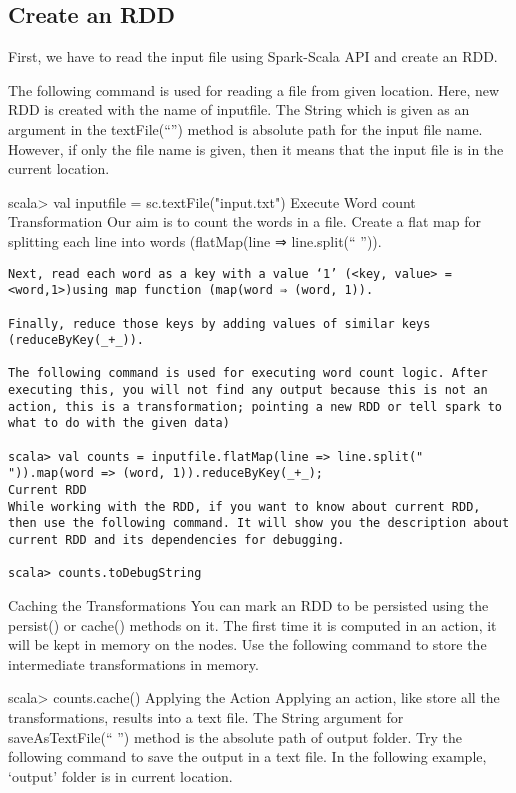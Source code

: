 \documentclass[a4paper,12pt]{article}
\begin{document}
\subsection*{Create an RDD}
First, we have to read the input file using Spark-Scala API and create an RDD.

The following command is used for reading a file from given location. Here, new RDD is created with the name of inputfile. The String which is given as an argument in the textFile(“”) method is absolute path for the input file name. However, if only the file name is given, then it means that the input file is in the current location.

scala> val inputfile = sc.textFile("input.txt")
Execute Word count Transformation
Our aim is to count the words in a file. Create a flat map for splitting each line into words (flatMap(line ⇒ line.split(“ ”)).

\begin{verbatim}
Next, read each word as a key with a value ‘1’ (<key, value> = <word,1>)using map function (map(word ⇒ (word, 1)).

Finally, reduce those keys by adding values of similar keys (reduceByKey(_+_)).

The following command is used for executing word count logic. After executing this, you will not find any output because this is not an action, this is a transformation; pointing a new RDD or tell spark to what to do with the given data)

scala> val counts = inputfile.flatMap(line => line.split(" ")).map(word => (word, 1)).reduceByKey(_+_);
Current RDD
While working with the RDD, if you want to know about current RDD, then use the following command. It will show you the description about current RDD and its dependencies for debugging.

scala> counts.toDebugString    
\end{verbatim}

Caching the Transformations
You can mark an RDD to be persisted using the persist() or cache() methods on it. The first time it is computed in an action, it will be kept in memory on the nodes. Use the following command to store the intermediate transformations in memory.

scala> counts.cache()
Applying the Action
Applying an action, like store all the transformations, results into a text file. The String argument for saveAsTextFile(“ ”) method is the absolute path of output folder. Try the following command to save the output in a text file. In the following example, ‘output’ folder is in current location.
\end{document}
